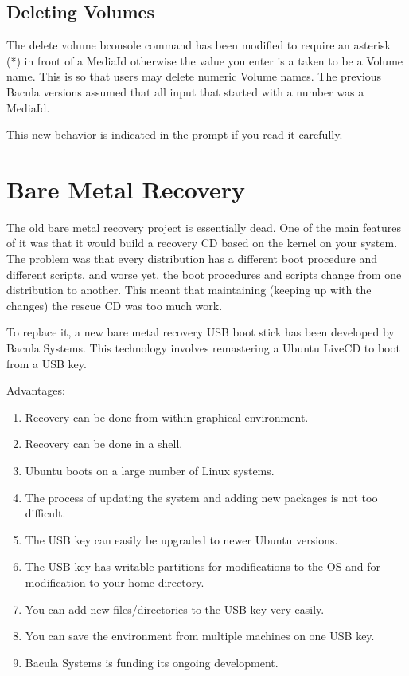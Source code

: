 \subsection{Deleting Volumes}
The delete volume bconsole command has been modified to
require an asterisk (*) in front of a MediaId otherwise the
value you enter is a taken to be a Volume name. This is so that
users may delete numeric Volume names. The previous Bacula versions
assumed that all input that started with a number was a MediaId.

This new behavior is indicated in the prompt if you read it
carefully.

\section{Bare Metal Recovery}
The old bare metal recovery project is essentially dead. One
of the main features of it was that it would build a recovery
CD based on the kernel on your system. The problem was that
every distribution has a different boot procedure and different 
scripts, and worse yet, the boot procedures and scripts change
from one distribution to another.  This meant that maintaining
(keeping up with the changes) the rescue CD was too much work.

To replace it, a new bare metal recovery USB boot stick has been developed
by Bacula Systems.  This technology involves remastering a Ubuntu LiveCD to
boot from a USB key.  

Advantages: 
\begin{enumerate} 
\item Recovery can be done from within graphical environment.  
\item Recovery can be done in a shell.  
\item Ubuntu boots on a large number of Linux systems.  
\item The process of updating the system and adding new
   packages is not too difficult. 
\item The USB key can easily be upgraded to newer Ubuntu versions.
\item The USB key has writable partitions for modifications to
   the OS and for modification to your home directory.
\item You can add new files/directories to the USB key very easily.
\item You can save the environment from multiple machines on
   one USB key.
\item Bacula Systems is funding its ongoing development.
\end{enumerate}

